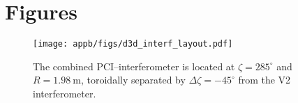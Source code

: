 \chapter{Figures}

\begin{figure}[ht]
\centering
\texttt{[image: appb/figs/d3d\_interf\_layout.pdf]}
\caption{%
  The combined PCI--interferometer is located at
  $\zeta = 285^{\circ}$ and $R = \SI{1.98}{\meter}$,
  toroidally separated by $\Delta \zeta = -45^{\circ}$
  from the V2 interferometer.}
\label{fig:d3d_interf_layout}
\end{figure}

\clearpage
\newpage
